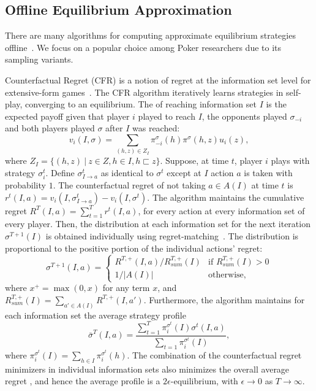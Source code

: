 \documentclass{aamas2015}
\newcommand{\defword}[1]{\textbf{\boldmath{#1}}}
\begin{document}
\subsection{Offline Equilibrium Approximation}

There are many algorithms for computing approximate equilibrium strategies offline~\cite{Sandholm10The}. We focus on a popular choice among Poker researchers due to its sampling variants.

Counterfactual Regret (CFR) is a notion of regret at the information set level for extensive-form games~\cite{CFR}. 
The CFR algorithm iteratively learns strategies in self-play, converging to an equilibrium. 
The \defword{counterfactual value} of reaching information set $I$ is the expected payoff given that player $i$ played to reach $I$, the opponents played 
$\sigma_{-i}$ and both players played $\sigma$ after $I$ was reached:
\begin{equation}
\label{eq:cfv}
v_i(I,\sigma) = \sum_{(h,z) \in Z_I} \pi^{\sigma}_{-i}(h) \pi^{\sigma}(h,z) u_i(z), 
\end{equation}
where $Z_I = \{ (h,z)~|~z \in Z, h \in I, h \sqsubset z \}$.
Suppose, at time $t$, player $i$ plays with strategy $\sigma^t_i$. 
Define $\sigma^t_{I \rightarrow a}$ as identical to $\sigma^t$ except at $I$ action $a$ is taken with probability $1$. 
The counterfactual regret of not taking $a \in A(I)$ at time $t$ is $r^t(I,a) = v_i(I,\sigma^t_{I \rightarrow a}) - v_i(I,\sigma^t)$. 
The algorithm maintains the cumulative regret $R^T(I,a) = \sum_{t=1}^T r^t(I,a)$, for every action at every information set of every player. 
Then, the distribution at each information set for the next iteration $\sigma^{T+1}(I)$ is obtained individually using 
regret-matching~\cite{Hart00}. The distribution is proportional to the positive portion of the individual actions' regret:
\begin{equation*}
\label{eq:rm}
\sigma^{T+1}(I,a) = \left\{
\begin{array}{ll}
R^{T,+}(I,a) / R^{T,+}_{sum}(I) & \mbox{if } R^{T,+}_{sum}(I) > 0 \\ 
1 / |A(I)|                   & \mbox{otherwise,}
\end{array} \right.
\end{equation*}
where $x^+ = \max(0,x)$ for any term $x$, and $R^{T,+}_{sum}(I) = \sum_{a' \in A(I)} R^{T,+}(I,a')$. Furthermore, the algorithm maintains for each information set the average strategy profile
\begin{equation}
\bar{\sigma}^T(I,a) = \frac{\sum_{t=1}^T \pi^{\sigma^t}_i(I) \sigma^t(I,a)}{\sum_{t=1} \pi^{\sigma^t}_i(I)}, 
\end{equation}
where $\pi^{\sigma^t}_i(I) = \sum_{h \in I}\pi^{\sigma^t}_i(h)$.
The combination of the counterfactual regret minimizers in individual information sets also minimizes the overall average regret \cite{CFR}, and hence the average profile is a $2\epsilon$-equilibrium, with $\epsilon \rightarrow 0$
as $T \rightarrow \infty$.
\end{document}
